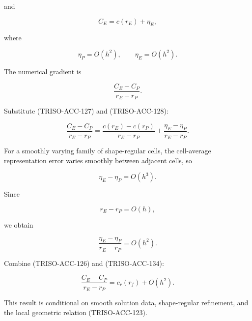 \documentclass[11pt,a4paper]{article}
\begin{document}
and

\begin{equation}
C_E=c(r_E)+\eta_E,
\tag{TRISO-ACC-128}
\label{eq:triso-acc-128}
\end{equation}

where

\begin{equation}
\eta_P=O(h^2),
\qquad
\eta_E=O(h^2).
\tag{TRISO-ACC-129}
\label{eq:triso-acc-129}
\end{equation}

The numerical gradient is

\begin{equation}
\frac{C_E-C_P}{r_E-r_P}.
\tag{TRISO-ACC-130}
\label{eq:triso-acc-130}
\end{equation}

Substitute (TRISO-ACC-127) and (TRISO-ACC-128):

\begin{equation}
\frac{C_E-C_P}{r_E-r_P}
=
\frac{c(r_E)-c(r_P)}{r_E-r_P}
+
\frac{\eta_E-\eta_P}{r_E-r_P}.
\tag{TRISO-ACC-131}
\label{eq:triso-acc-131}
\end{equation}

For a smoothly varying family of shape-regular cells, the cell-average representation error varies smoothly between adjacent cells, so

\begin{equation}
\eta_E-\eta_P=O(h^3).
\tag{TRISO-ACC-132}
\label{eq:triso-acc-132}
\end{equation}

Since

\begin{equation}
r_E-r_P=O(h),
\tag{TRISO-ACC-133}
\label{eq:triso-acc-133}
\end{equation}

we obtain

\begin{equation}
\frac{\eta_E-\eta_P}{r_E-r_P}
=
O(h^2).
\tag{TRISO-ACC-134}
\label{eq:triso-acc-134}
\end{equation}

Combine (TRISO-ACC-126) and (TRISO-ACC-134):

\begin{equation}
\boxed{
\frac{C_E-C_P}{r_E-r_P}
=
c_r(r_f)
+
O(h^2).
}
\tag{TRISO-ACC-135}
\label{eq:triso-acc-135}
\end{equation}

This result is conditional on smooth solution data, shape-regular refinement, and the local geometric relation (TRISO-ACC-123).
\end{document}
